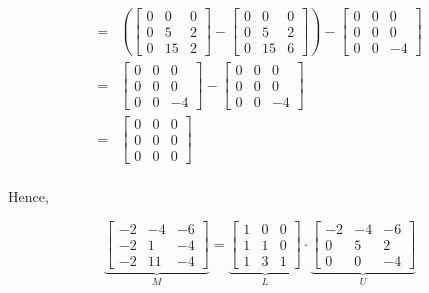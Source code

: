 \begin{tcolorbox}[title=\textbf{\Large Let's remind ourselves why this works:}]
\begin{align*}
    =& \left( \left[ \begin{array}{rrr} 0 & 0 & 0 \\ 0 & 5 & 2 \\ 0 & 15 & 2 \end{array} \right] -  \left[ \begin{array}{rrr} 0 & 0 & 0 \\ 0 & 5 & 2 \\ 0 & 15 & 6 \end{array} \right] \right) - \left[ \begin{array}{rrr} 0 & 0 & 0 \\ 0 & 0 & 0 \\ 0 & 0 & -4 \end{array} \right] \\ 
    =& \left[ \begin{array}{rrr} 0 & 0 & 0 \\ 0 & 0 & 0 \\ 0 & 0 & -4 \end{array} \right] - \left[ \begin{array}{rrr} 0 & 0 & 0 \\ 0 & 0 & 0 \\ 0 & 0 & -4 \end{array} \right] \\ 
    =& \left[ \begin{array}{rrr} 0 & 0 & 0 \\ 0 & 0 & 0 \\ 0 & 0 & 0 \end{array} \right] \\ 
\end{align*}
\end{tcolorbox}

Hence,

$$\underbrace{\left[\begin{array}{rrr} -2 & -4 & -6\\
-2 & 1 & -4 \\ -2 & 11 & -4 \end{array}\right]}_{M} =  \underbrace{\left[\begin{array}{rrr} 1 & 0 & 0\\ 1 & 1 & 0\\ 1 & 3  & 1\end{array} \right]}_{L} \cdot \underbrace{\left[\begin{array}{rrr} -2 & -4 & -6 \\ 0 & 5 &  2 \\ 0 &  0 & -4\end{array} \right]}_{U} $$

